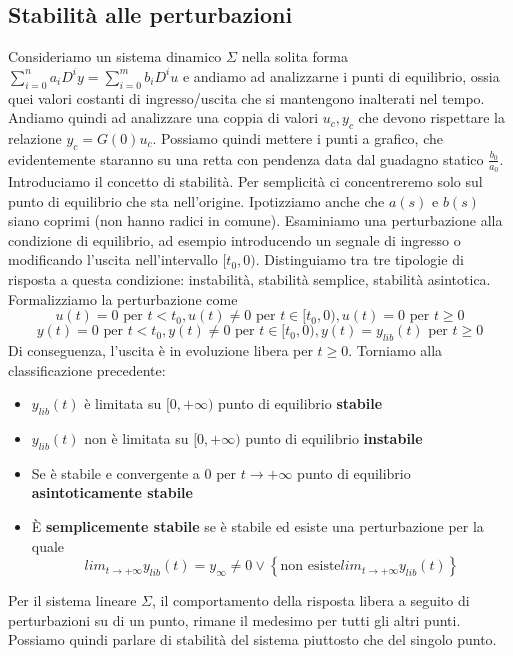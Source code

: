 \documentclass[11pt]{article}
\begin{document}
\subsection{Stabilità alle perturbazioni}
Consideriamo un sistema dinamico $\Sigma$ nella solita forma $\sum_{i=0}^n a_i D^i y = \sum_{i=0}^m b_i D^i u$ e andiamo ad analizzarne i punti di equilibrio, ossia quei valori costanti di ingresso/uscita che si mantengono inalterati nel tempo. Andiamo quindi ad analizzare una coppia di valori $u_c, y_c$ che devono rispettare la relazione $y_c = G(0)u_c$. Possiamo quindi mettere i punti a grafico, che evidentemente staranno su una retta con pendenza data dal guadagno statico $\frac{b_0}{a_0}$.
Introduciamo il concetto di stabilità. Per semplicità ci concentreremo solo sul punto di equilibrio che sta nell'origine. Ipotizziamo anche che $a(s)$ e $b(s)$ siano coprimi (non hanno radici in comune). Esaminiamo una perturbazione alla condizione di equilibrio, ad esempio introducendo un segnale di ingresso o modificando l'uscita nell'intervallo $[t_0,0)$.
Distinguiamo tra tre tipologie di risposta a questa condizione: instabilità, stabilità semplice, stabilità asintotica. Formalizziamo la perturbazione come
\begin{displaymath}
    u(t) = 0 \textrm{ per }t<t_0, u(t) \neq 0 \textrm{ per }t\in[t_0, 0), u(t)=0 \textrm{ per }t\ge0
\end{displaymath}
\begin{displaymath}
    y(t) = 0 \textrm{ per }t<t_0, y(t) \neq 0 \textrm{ per }t\in [t_0,0), y(t)=y_{lib}(t) \textrm{ per }t\ge0
\end{displaymath}
Di conseguenza, l'uscita è in evoluzione libera per $t\ge0$.
Torniamo alla classificazione precedente:
\begin{itemize}
    \item $y_{lib}(t)$ è limitata su $[0,+\infty)$ punto di equilibrio \textbf{stabile}
    \item $y_{lib}(t)$ non è limitata su $[0,+\infty)$ punto di equilibrio \textbf{instabile}
    \item Se è stabile e convergente a $0$ per $t\rightarrow+\infty$ punto di equilibrio \textbf{asintoticamente stabile}
    \item È \textbf{semplicemente stabile} se è stabile ed esiste una perturbazione per la quale \begin{displaymath}
              lim_{t\rightarrow+\infty}y_{lib}(t)=y_\infty \neq 0 \vee \left\{\textrm{non esiste} lim_{t\rightarrow+\infty} y_{lib}(t)\right\}
          \end{displaymath}
\end{itemize}
\begin{center}
    Per il sistema lineare $\Sigma$, il comportamento della risposta libera a seguito di perturbazioni su di un punto, rimane il medesimo per tutti gli altri punti. Possiamo quindi parlare di stabilità del sistema piuttosto che del singolo punto.
\end{center}
\end{document}
